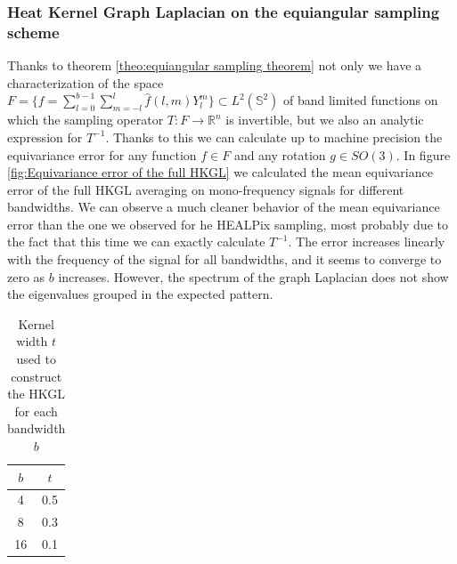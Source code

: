 \subsubsection{Heat Kernel Graph Laplacian on the equiangular sampling scheme}
Thanks to theorem \ref{theo:equiangular sampling theorem} not only we have a characterization of the space \\$F=\{f=\sum_{l=0}^{b-1} \sum_{m=-l}^{l} \widehat{f}(l, m) Y_{l}^{m}\}\subset L^2(\mathbb  S^2)$ of band limited functions on which the sampling operator $T: F\to \mathbb R^n$ is invertible, but we also an analytic expression for $T^{-1}$. Thanks to this we can calculate up to machine precision the equivariance error for any function $f\in F$ and any rotation $g\in SO(3)$. In figure \ref{fig:Equivariance error of the full HKGL} we calculated the mean equivariance error of the full HKGL averaging on mono-frequency signals for different bandwidths. We can observe a much cleaner behavior of the mean equivariance error than the one we observed for he HEALPix sampling, most probably due to the fact that this time we can exactly calculate $T^{-1}$. The error increases linearly with the frequency of the signal for all bandwidths, and it seems to converge to zero as $b$ increases. However, the spectrum of the graph Laplacian does not show the eigenvalues grouped in the expected pattern.
\begin{table}[h!]
	\centering
	\begin{tabular}{ c|c } 
$b$ & $t$ \\ 
	\hline
4 & 0.5 \\ 
8 & 0.3 \\ 
16 & 0.1 \\ 
	\end{tabular}
	\caption{\label{table:equiangular kernel width}Kernel width $t$ used to construct the HKGL for each bandwidth $b$}
\end{table}

